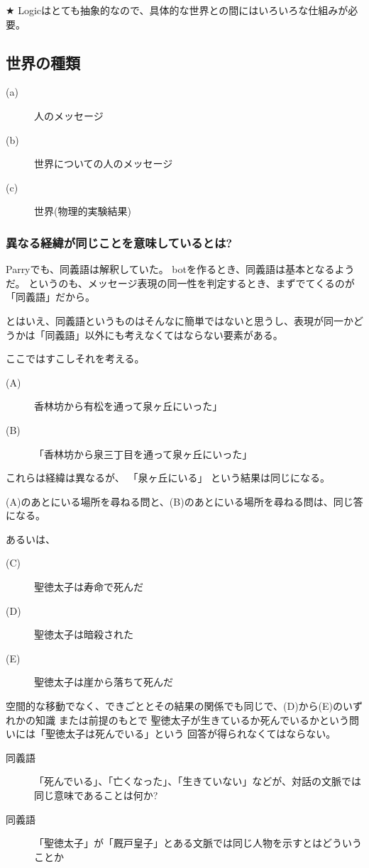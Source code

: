 \documentclass[10pt, oneside]{jarticle}   	%
\begin{document}
★ Logicはとても抽象的なので、具体的な世界との間にはいろいろな仕組みが必要。

\subsection{世界の種類}
\begin{description}
\item[ (a)] 人のメッセージ
\item[ (b)] 世界についての人のメッセージ
\item[ (c)] 世界(物理的実験結果)
\end{description}


\subsubsection{異なる経緯が同じことを意味しているとは?}
Parryでも、同義語は解釈していた。
botを作るとき、同義語は基本となるようだ。
というのも、メッセージ表現の同一性を判定するとき、まずでてくるのが「同義語」だから。

とはいえ、同義語というものはそんなに簡単ではないと思うし、表現が同一かどうかは「同義語」以外にも考えなくてはならない要素がある。

ここではすこしそれを考える。

\begin{description}
\item[(A)]香林坊から有松を通って泉ヶ丘にいった」
\item[(B)]「香林坊から泉三丁目を通って泉ヶ丘にいった」
\end{description}
これらは経緯は異なるが、
「泉ヶ丘にいる」
という結果は同じになる。

(A)のあとにいる場所を尋ねる問と、(B)のあとにいる場所を尋ねる問は、同じ答になる。

あるいは、
\begin{description}
\item[ (C)] 聖徳太子は寿命で死んだ
\item[ (D)] 聖徳太子は暗殺された
\item[ (E)] 聖徳太子は崖から落ちて死んだ
\end{description}

空間的な移動でなく、できごととその結果の関係でも同じで、(D)から(E)のいずれかの知識
または前提のもとで
聖徳太子が生きているか死んでいるかという問いには「聖徳太子は死んでいる」という
回答が得られなくてはならない。

\begin{description}
\item[ 同義語] 「死んでいる」、「亡くなった」、「生きていない」などが、対話の文脈では同じ意味であることは何か?
\item[ 同義語] 「聖徳太子」が「厩戸皇子」とある文脈では同じ人物を示すとはどういうことか
\end{description}
\end{document}
